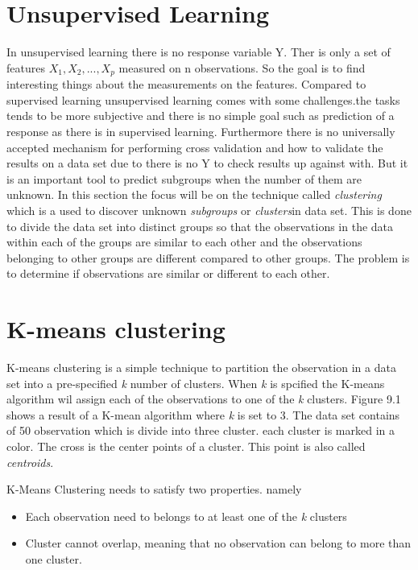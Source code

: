 \chapter{Unsupervised Learning}
\label{chp:unsuplea}
In unsupervised learning there is no response variable Y. Ther is only a set of features $X_1, X_2,..., X_p$ measured on n observations. So the goal is to find interesting things about the measurements on the features.
Compared to supervised learning unsupervised learning comes with some challenges.the tasks tends to be more subjective and there is no simple goal such as prediction of a response as there is in supervised learning. Furthermore there is no universally accepted mechanism for performing cross validation and how to validate the results on a data set due to there is no Y to check results up against with.
But it is an important tool to predict subgroups when the number of them are unknown.
In this section the focus will be on the  technique called \emph{clustering} which is a used to discover unknown \emph{subgroups} or \emph{clusters}in data set. This is done to divide the data set into distinct groups so that the observations in the data within each of the groups are similar to each other and the observations belonging to other groups are different compared to other groups. 
The problem is to determine if observations are similar or different to each other.
 
\chapter{K-means clustering}
\label{chp:clus}
K-means clustering is a simple technique to partition the observation in a data set into a pre-specified \emph{k} number of clusters. When \emph{k} is spcified the K-means algorithm wil assign each of the observations to one of the \emph{k} clusters.
Figure 9.1 shows a result of a K-mean algorithm where \emph{k} is set to 3. The data set contains of 50 observation which is divide into three cluster. each cluster is marked in a color. The cross is the center points of a cluster. This point is also called \emph{centroids}.


K-Means Clustering needs to satisfy two properties. namely
\begin{itemize}
	\item Each observation need to belongs to at least one of the \emph{k} clusters
	\item Cluster cannot overlap, meaning that no observation can belong to more than one cluster.
\end{itemize} 

